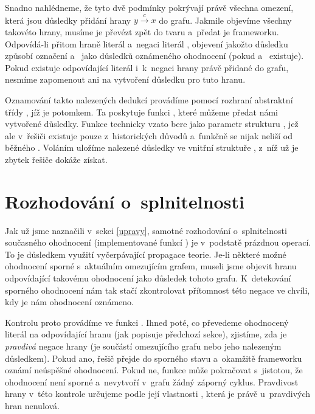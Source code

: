 Snadno nahlédneme, že tyto dvě podmínky pokrývají právě všechna omezení, která jsou důsledky přidání hrany $y \xrightarrow{c} x$ do grafu. Jakmile objevíme všechny takovéto hrany, musíme je převézt zpět do tvaru  a~předat je frameworku. Odpovídá-li přitom hraně  literál  a~negaci  literál , objevení  jakožto důsledku způsobí označení  a~ jako důsledků oznámeného ohodnocení (pokud  a~ existuje). Pokud existuje odpovídající literál  i~k~negaci hrany právě přidané do grafu, nesmíme zapomenout ani na vytvoření důsledku  pro tuto hranu.

Oznamování takto nalezených dedukcí provádíme pomocí rozhraní abstraktní třídy , jíž je  potomkem. Ta poskytuje funkci , které můžeme předat námi vytvořené důsledky. Funkce technicky vzato bere jako parametr strukturu , jež ale v~řešiči existuje pouze z~historických důvodů a~funkčně se nijak neliší od běžného . Voláním  uložíme nalezené důsledky ve vnitřní struktuře , z~níž už je zbytek řešiče dokáže získat.

\section{Rozhodování o~splnitelnosti}\label{rozhod}

Jak už jsme naznačili v~sekci \ref{upravy}, samotné rozhodování o~splnitelnosti současného ohodnocení (implementované funkcí ) je v~podstatě prázdnou operací. To je důsledkem využití vyčerpávající propagace teorie. Je-li některé možné ohodnocení sporné s~aktuálním omezujícím grafem, museli jsme objevit hranu odpovídající takovému ohodnocení jako důsledek tohoto grafu. K~detekování sporného ohodnocení nám tak stačí zkontrolovat přítomnost této negace ve chvíli, kdy je nám ohodnocení oznámeno.

Kontrolu proto provádíme ve funkci . Ihned poté, co převedeme ohodnocený literál na odpovídající hranu (jak popisuje předchozí sekce), zjistíme, zda je \emph{pravdivá} negace hrany (je součástí omezujícího grafu nebo jeho nalezeným důsledkem). Pokud ano, řešič přejde do sporného stavu a~okamžitě frameworku oznámí neúspěšné ohodnocení. Pokud ne, funkce může pokračovat s~jistotou, že ohodnocení není sporné a~nevytvoří v~grafu žádný záporný cyklus. Pravdivost hrany v~této kontrole určujeme podle její vlastnosti , která je právě u~pravdivých hran nenulová.

